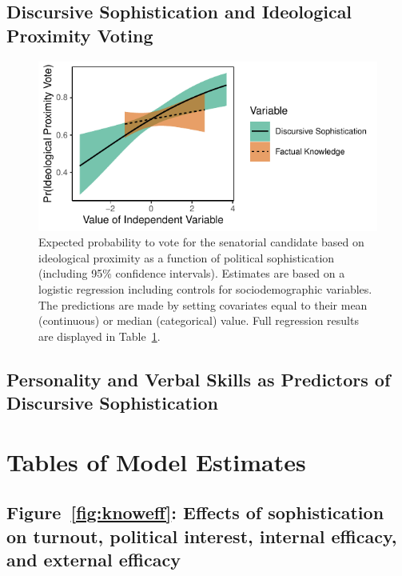 \clearpage
\subsection{Discursive Sophistication and Ideological Proximity Voting}\label{app:proximity}

\begin{figure}[h]\centering
	\includegraphics{../fig/correct_vote.pdf}
	\caption{Expected probability to vote for the senatorial candidate based on ideological proximity as a function of political sophistication (including 95\% confidence intervals). Estimates are based on a logistic regression including controls for sociodemographic variables. The predictions are made by setting covariates equal to their mean (continuous) or median (categorical) value. Full regression results are displayed in Table~\ref{fig:correct_vote}.}\label{fig:correct_vote}
\end{figure}



\clearpage
\subsection{Personality and Verbal Skills as Predictors of Discursive Sophistication}\label{app:determinants_rob}





\clearpage
\section{Tables of Model Estimates}\label{app:tables}

\subsection{Figure~\ref{fig:knoweff}: Effects of sophistication on turnout, political interest, internal efficacy, and external efficacy}








\clearpage

